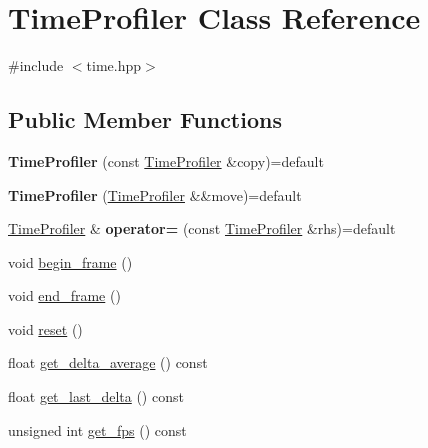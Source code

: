 \hypertarget{class_time_profiler}{}\section{Time\+Profiler Class Reference}
\label{class_time_profiler}


{\ttfamily \#include $<$time.\+hpp$>$}

\subsection*{Public Member Functions}
\begin{DoxyCompactItemize}
\item 
\mbox{\label{class_time_profiler_a9178bba0d24e58fee4aef9e3fab2d620}} 
{\bfseries Time\+Profiler} (const \mbox{\hyperlink{class_time_profiler}{Time\+Profiler}} \&copy)=default
\item 
\mbox{\label{class_time_profiler_a82cdfc8e60b457a7ea9a3566ca2138c3}} 
{\bfseries Time\+Profiler} (\mbox{\hyperlink{class_time_profiler}{Time\+Profiler}} \&\&move)=default
\item 
\mbox{\label{class_time_profiler_a0461511b6fdd47cb628c6866cb1d083f}} 
\mbox{\hyperlink{class_time_profiler}{Time\+Profiler}} \& {\bfseries operator=} (const \mbox{\hyperlink{class_time_profiler}{Time\+Profiler}} \&rhs)=default
\item 
void \mbox{\hyperlink{class_time_profiler_a336b6225fb048d7f0cccf4a7fc721bbb}{begin\+\_\+frame}} ()
\item 
void \mbox{\hyperlink{class_time_profiler_a51540762400c7493125ba3dbf5dfee4e}{end\+\_\+frame}} ()
\item 
void \mbox{\hyperlink{class_time_profiler_aaaccee940365a619c03f1f69a46803e4}{reset}} ()
\item 
float \mbox{\hyperlink{class_time_profiler_a6778c6545bc103055ee8e4e4bee57407}{get\+\_\+delta\+\_\+average}} () const
\item 
float \mbox{\hyperlink{class_time_profiler_a44468954e79b02942fb168b6597280a1}{get\+\_\+last\+\_\+delta}} () const
\item 
unsigned int \mbox{\hyperlink{class_time_profiler_a49dc639e9dd12ee6313707722f7e8ffe}{get\+\_\+fps}} () const
\end{DoxyCompactItemize}


